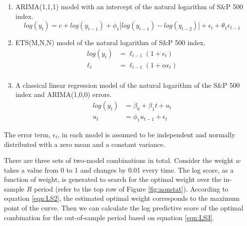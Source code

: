 \documentclass{monashthesis}
\begin{document}
\begin{enumerate}
\def\labelenumi{\arabic{enumi}.}
\item
  ARIMA(1,1,1) model with an intercept of the natural logarithm of S\&P 500 index.
  \begin{equation*}
  log(y_t) = c + log(y_{t-1}) + \phi_1\big[log(y_{t-1})-log(y_{t-2})\big] + \epsilon_t + \theta_1\epsilon_{t-1}
  \end{equation*}
\item
  ETS(M,N,N) model of the natural logarithm of S\&P 500 index.
  \begin{align*}
  log(y_t) &= \ell_{t-1} (1+\epsilon_t) \\
  \ell_t &= \ell_{t-1} (1+\alpha \epsilon_t) \\
  \end{align*}
\item
  A classical linear regression model of the natural logarithm of the S\&P 500 index and ARIMA(1,0,0) errors.
  \begin{align*}
  log(y_t) &= \beta_0 + \beta_1 t + u_t \\
  u_t &= \phi_1 u_{t-1} + \epsilon_t
  \end{align*}
\end{enumerate}

The error term, \(\epsilon_t\), in each model is assumed to be independent and normally distributed with a zero mean and a constant variance.

There are three sets of two-model combinations in total. Consider the weight \(w\) takes a value from 0 to 1 and changes by 0.01 every time. The log score, as a function of weight, is generated to search for the optimal weight over the in-sample \(R\) period (refer to the top row of Figure \ref{fig:nonstat}). According to equation \ref{eqn:LS2}, the estimated optimal weight corresponds to the maximum point of the curve. Then we can calculate the log predictive score of the optimal combination for the out-of-sample period based on equation \ref{eqn:LS3}.
\end{document}
